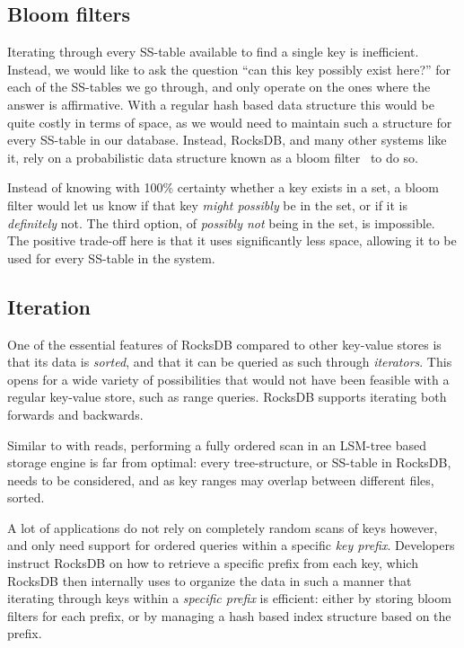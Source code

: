 \subsection{Bloom filters}\label{sec:bloom}

Iterating through every SS-table available to find a single key is inefficient.
Instead, we would like to ask the question ``can this key possibly exist here?''
for each of the SS-tables we go through, and only operate on the ones where the
answer is affirmative. With a regular hash based data structure this would be
quite costly in terms of space, as we would need to maintain such a structure
for every SS-table in our database. Instead, RocksDB, and many other systems
like it, rely on a probabilistic data structure known as a bloom
filter~\cite{bloom} to do so.

Instead of knowing with 100\% certainty whether a key exists in a set, a bloom
filter would let us know if that key \textit{might possibly} be in the set, or
if it is \textit{definitely} not. The third option, of \textit{possibly not}
being in the set, is impossible. The positive trade-off here is that it uses
significantly less space, allowing it to be used for every SS-table in the
system.

\subsection{Iteration}
One of the essential features of RocksDB compared to other key-value stores is
that its data is \textit{sorted}, and that it can be queried as such through
\textit{iterators}. This opens for a wide variety of possibilities that would
not have been feasible with a regular key-value store, such as range queries.
RocksDB supports iterating both forwards and backwards.

Similar to with reads, performing a fully ordered scan in an LSM-tree based
storage engine is far from optimal: every tree-structure, or SS-table in
RocksDB, needs to be considered, and as key ranges may overlap between different
files, sorted.

A lot of applications do not rely on completely random scans of keys however,
and only need support for ordered queries within a specific \textit{key prefix}.
Developers instruct RocksDB on how to retrieve a specific prefix from each key,
which RocksDB then internally uses to organize the data in such a manner that
iterating through keys within a \textit{specific prefix} is efficient: either by
storing bloom filters for each prefix, or by managing a hash based index
structure based on the prefix.

